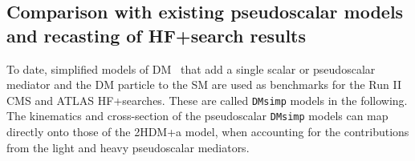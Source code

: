 \subsection{Comparison with existing pseudoscalar models and recasting of HF+\MET search results}

To date, simplified models of DM~\cite{Abercrombie:2015wmb,Backovic:2015soa} that add a single scalar or pseudoscalar mediator and the DM particle to the SM are used as benchmarks for the Run II CMS and ATLAS HF+\MET searches. These are called \texttt{DMsimp} models in the following. The kinematics and cross-section of the pseudoscalar \texttt{DMsimp} models can map directly onto those of the 2HDM+a model, when accounting for the contributions from the light and heavy pseudoscalar mediators.


